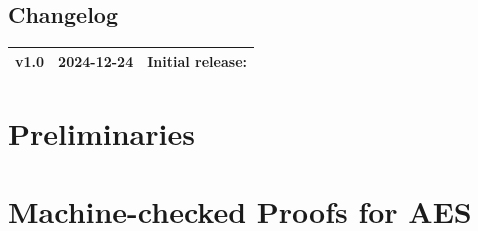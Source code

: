 \documentclass[11pt,openany]{article}
\begin{document}
\vfill
\subsection*{Changelog}
\large
\begin{tabular}{@{} L{0.05\textwidth} L{0.2\textwidth} L{0.7\textwidth} @{}} %
	\toprule
	v1.0 & 2024-12-24 & Initial release: \\%
	\bottomrule
\end{tabular}

\newpage


\tableofcontents
\newpage
\section{Preliminaries}


\newpage
%

\newpage
\section{Machine-checked Proofs for AES}

\newpage
%

%
%
%
%
\end{document}
